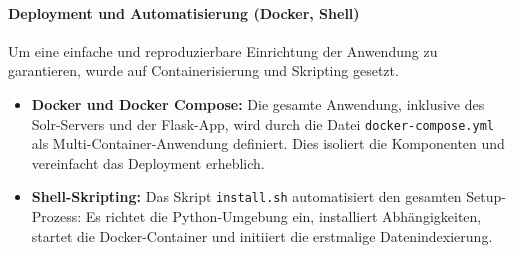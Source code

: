 \paragraph{Deployment und Automatisierung (Docker, Shell)}
Um eine einfache und reproduzierbare Einrichtung der Anwendung zu garantieren, wurde auf Containerisierung und Skripting gesetzt.
\begin{itemize}
    \item \textbf{Docker und Docker Compose:} Die gesamte Anwendung, inklusive des Solr-Servers und der Flask-App, wird durch die Datei \texttt{docker-compose.yml} als Multi-Container-Anwendung definiert. Dies isoliert die Komponenten und vereinfacht das Deployment erheblich.
    
    \item \textbf{Shell-Skripting:} Das Skript \texttt{install.sh} automatisiert den gesamten Setup-Prozess: Es richtet die Python-Umgebung ein, installiert Abhängigkeiten, startet die Docker-Container und initiiert die erstmalige Datenindexierung.
\end{itemize}